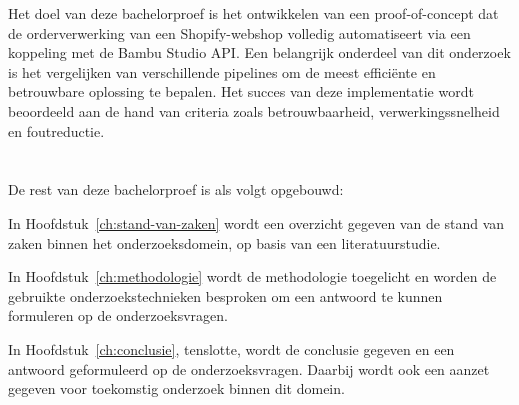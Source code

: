Het doel van deze bachelorproef is het ontwikkelen van een proof-of-concept dat de orderverwerking van een Shopify-webshop volledig automatiseert via een koppeling met de Bambu Studio API. Een belangrijk onderdeel van dit onderzoek is het vergelijken van verschillende pipelines om de meest efficiënte en betrouwbare oplossing te bepalen. Het succes van deze implementatie wordt beoordeeld aan de hand van criteria zoals betrouwbaarheid, verwerkingssnelheid en foutreductie.


\section{}%
\label{sec:opzet-bachelorproef}


De rest van deze bachelorproef is als volgt opgebouwd:

In Hoofdstuk~\ref{ch:stand-van-zaken} wordt een overzicht gegeven van de stand van zaken binnen het onderzoeksdomein, op basis van een literatuurstudie.

In Hoofdstuk~\ref{ch:methodologie} wordt de methodologie toegelicht en worden de gebruikte onderzoekstechnieken besproken om een antwoord te kunnen formuleren op de onderzoeksvragen.


In Hoofdstuk~\ref{ch:conclusie}, tenslotte, wordt de conclusie gegeven en een antwoord geformuleerd op de onderzoeksvragen. Daarbij wordt ook een aanzet gegeven voor toekomstig onderzoek binnen dit domein.
